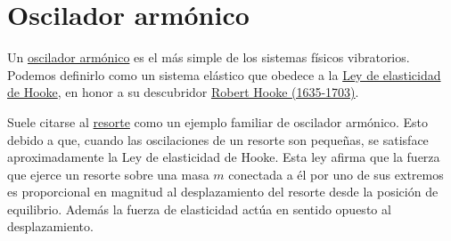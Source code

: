 \section{Oscilador armónico}\label{resortito}




Un \href{http://es.wikipedia.org/wiki/Oscilador_armónico}{oscilador armónico} es el más simple de los sistemas físicos vibratorios. Podemos definirlo como un sistema
elástico que obedece a la \href{http://es.wikipedia.org/wiki/Ley_de_Hooke}{Ley de elasticidad de Hooke}, en honor a su descubridor
\href{http://es.wikipedia.org/wiki/Robert_Hooke}{Robert Hooke (1635-1703)}.

Suele citarse al \href{http://es.wikipedia.org/wiki/Resorte}{resorte} como un ejemplo familiar de oscilador armónico. Esto debido a que, cuando las oscilaciones de un resorte son
pequeñas,  se satisface aproximadamente la Ley de elasticidad de  Hooke. Esta ley  afirma que la fuerza que ejerce un resorte sobre una masa $m$ conectada a él por uno
de sus extremos es proporcional en magnitud al desplazamiento
del resorte desde la posición de equilibrio. Además la fuerza de elasticidad actúa en sentido opuesto al desplazamiento.

